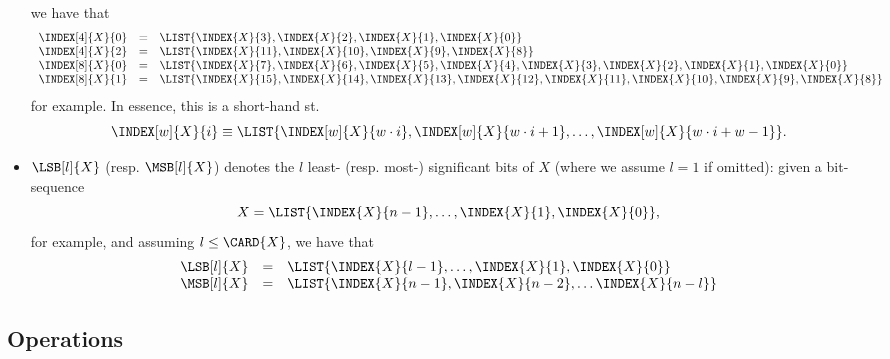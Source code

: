 \begin{itemize}
      we have that
      \[
      \begin{array}{lcl}
      \INDEX[4]{X}{0} &=& \LIST{ \INDEX{X}{ 3}, \INDEX{X}{ 2}, \INDEX{X}{ 1}, \INDEX{X}{ 0}                                                             } \\
      \INDEX[4]{X}{2} &=& \LIST{ \INDEX{X}{11}, \INDEX{X}{10}, \INDEX{X}{ 9}, \INDEX{X}{ 8}                                                             } \\
      \INDEX[8]{X}{0} &=& \LIST{ \INDEX{X}{ 7}, \INDEX{X}{ 6}, \INDEX{X}{ 5}, \INDEX{X}{ 4}, \INDEX{X}{ 3}, \INDEX{X}{ 2}, \INDEX{X}{ 1}, \INDEX{X}{ 0} } \\
      \INDEX[8]{X}{1} &=& \LIST{ \INDEX{X}{15}, \INDEX{X}{14}, \INDEX{X}{13}, \INDEX{X}{12}, \INDEX{X}{11}, \INDEX{X}{10}, \INDEX{X}{ 9}, \INDEX{X}{ 8} } \\
      \end{array}
      \]
      for example.  In essence, this is a short-hand st.
      \[
      \INDEX[w]{X}{i} \equiv \LIST{ \INDEX[w]{X}{w \cdot i}, \INDEX[w]{X}{w \cdot i + 1}, \ldots, \INDEX[w]{X}{w \cdot i + w - 1} } .
      \]
\item $\LSB[l]{X}$ (resp. $\MSB[l]{X}$) denotes the $l$ least- (resp. most-)
      significant bits of $X$ (where we assume $l = 1$ if omitted): given a
      bit-sequence
      \[
      X = \LIST{ \INDEX{X}{n-1}, \ldots, \INDEX{X}{1}, \INDEX{X}{0} } ,
      \]
      for example, and assuming $l \leq \CARD{X}$, we have that
      \[
      \begin{array}{lcl}
      \LSB[l]{X} &=& \LIST{ \INDEX{X}{l-1},                 \ldots, \INDEX{X}{  1}, \INDEX{X}{  0} } \\
      \MSB[l]{X} &=& \LIST{ \INDEX{X}{n-1}, \INDEX{X}{n-2}, \ldots                  \INDEX{X}{n-l} } \\
      \end{array}
      \]

\end{itemize}


\subsection{Operations}

